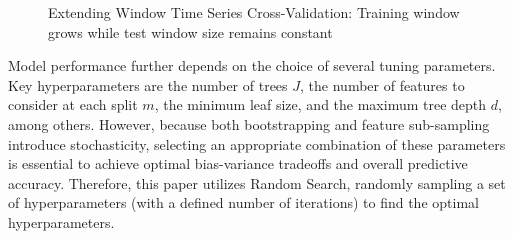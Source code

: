 \begin{figure}[H]
    \caption{Extending Window Time Series Cross-Validation: Training window grows while test window size remains constant}
    \end{figure}

Model performance further depends on the choice of several tuning parameters.  Key hyperparameters are the number of trees $J$, the number of features to consider at each split $m$, the minimum leaf size, and the maximum tree depth $d$, among others.  However, because both bootstrapping and feature sub-sampling introduce stochasticity, selecting an appropriate combination of these parameters is essential to achieve optimal bias-variance tradeoffs and overall predictive accuracy. Therefore, this paper utilizes Random Search, randomly sampling a set of hyperparameters (with a defined number of iterations) to find the optimal hyperparameters. 

